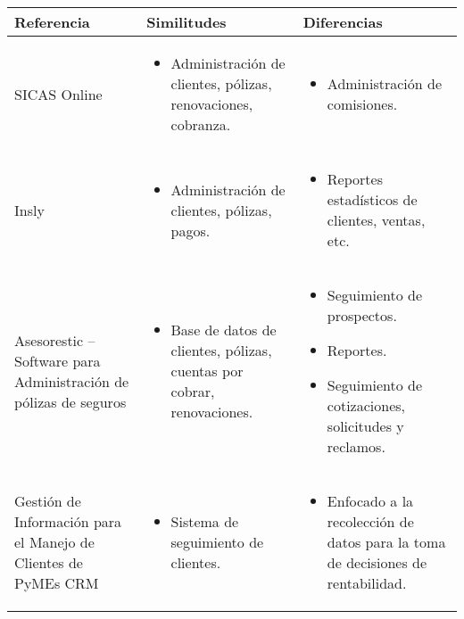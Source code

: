 \begin{table}[ht!] %
  \begin{tabular}{p{} p{} p{}}
    \toprule
    \textbf{{Referencia}} & \textbf{{Similitudes}} & \textbf{{Diferencias}} \\
    \toprule
    SICAS Online &
    \begin{itemize}[leftmargin=*]
        \item Administración de clientes, pólizas, renovaciones, cobranza.
    \end{itemize} &
    \begin{itemize}[leftmargin=*]
        \item Administración de comisiones.
    \end{itemize} \\
    \midrule
    
    Insly &
    \begin{itemize}[leftmargin=*]
        \item Administración de clientes, pólizas, pagos.
    \end{itemize} &
    \begin{itemize}[leftmargin=*]
        \item Reportes estadísticos de clientes, ventas, etc.
    \end{itemize} \\

\midrule
Asesorestic – Software para Administración de pólizas de seguros &
\begin{itemize}[leftmargin=*]
	\item Base de datos de clientes, pólizas, cuentas por cobrar, renovaciones.
\end{itemize} &
\begin{itemize}[leftmargin=*]
	\item Seguimiento de prospectos.
	\item Reportes.
	\item Seguimiento de cotizaciones, solicitudes y reclamos.
\end{itemize} \\

\midrule
Gestión de Información para el Manejo de Clientes de PyMEs CRM &
\begin{itemize}[leftmargin=*]
	\item Sistema de seguimiento de clientes.
\end{itemize} &
\begin{itemize}[leftmargin=*]
	\item Enfocado a la recolección de datos para la toma de decisiones de rentabilidad.
\end{itemize} \\


\end{tabular}
\end{table}
